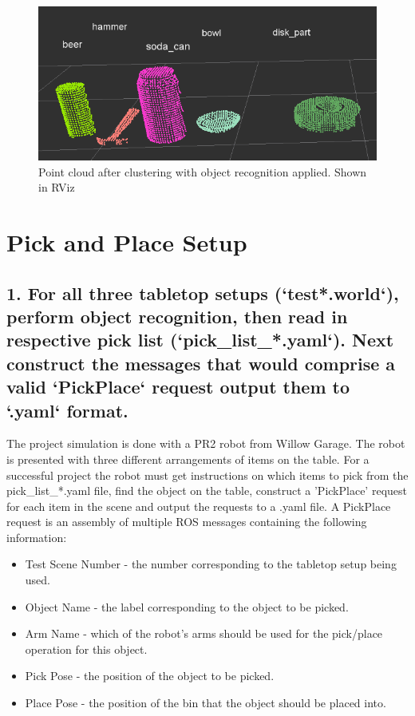 \documentclass{article}
\begin{document}
\begin{figure}[H]
    \includegraphics[width=\linewidth]{classification.png}
    \caption{Point cloud after clustering with object recognition applied. Shown in RViz}
    \label{fig:classification}
\end{figure}

\section{Pick and Place Setup}

\subsection{1. For all three tabletop setups (`test*.world`), perform object recognition, then read in respective pick list (`pick\_list\_*.yaml`). Next construct the messages that would comprise a valid `PickPlace` request output them to `.yaml` format.}\label{subsec:projintro}

The project simulation is done with a PR2 robot from Willow Garage. The robot is presented with three different arrangements of items on the table. For a successful project the robot must get instructions on which items to pick from the pick\_list\_*.yaml file, find the object on the table, construct a 'PickPlace' request for each item in the scene and output the requests to a .yaml file. A PickPlace request is an assembly of multiple ROS messages containing the following information:
\begin{itemize}
    \item Test Scene Number - the number corresponding to the tabletop setup being used.
    \item Object Name - the label corresponding to the object to be picked.
    \item Arm Name - which of the robot's arms should be used for the pick/place operation for this object.
    \item Pick Pose - the position of the object to be picked.
    \item Place Pose - the position of the bin that the object should be placed into.
\end{itemize}
\end{document}
